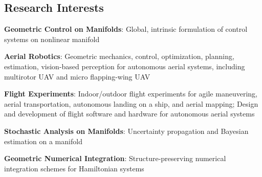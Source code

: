 \documentclass[10pt]{article}
\begin{document}
\vspace*{0.2cm}

\subsection*{Research Interests}
\begin{list}{}%
{\setlength{\leftmargin}{1.0cm}\setlength{\itemindent}{-0.5cm}
\setlength{\parsep}{0cm}\setlength{\itemsep}{0.12cm}\setlength{\parskip}{0cm}\setlength{\topsep}{0cm}\setlength{\partopsep}{0cm}}

\item \textbf{Geometric Control on Manifolds}: Global, intrinsic formulation of control systems on nonlinear manifold 

\item \textbf{Aerial Robotics}: Geometric mechanics, control, optimization, planning, estimation, vision-based perception for autonomous aerial systems, including multirotor UAV and micro flapping-wing UAV

\item \textbf{Flight Experiments}: Indoor/outdoor flight experiments for agile maneuvering, aerial transportation, autonomous landing on a ship, and aerial mapping; Design and development of flight software and hardware for autonomous aerial systems 

\item \textbf{Stochastic Analysis on Manifolds}: Uncertainty propagation and Bayesian estimation on a manifold

\item \textbf{Geometric Numerical Integration}: Structure-preserving numerical integration schemes for Hamiltonian systems


\vspace*{0.2cm}






\end{list}
\end{document}

